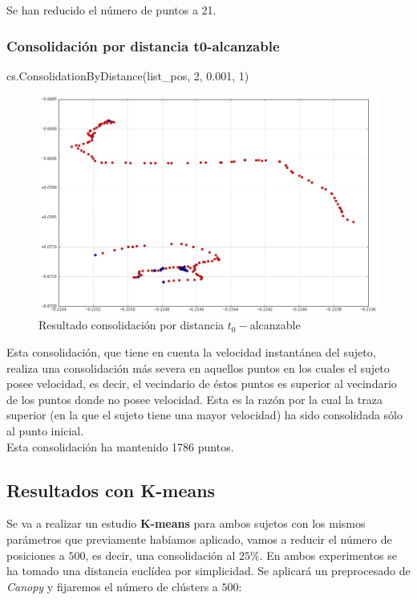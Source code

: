 \documentclass[a4paper, 12pt, spanish]{article}
\begin{document}
Se han reducido el n\'umero de puntos a 21.\\

\subsubsection{Consolidaci\'on por distancia t0-alcanzable}

\begin{python}
cs.ConsolidationByDistance(list_pos, 2, 0.001, 1)
\end{python}

\begin{figure}[H]
	\includegraphics[scale=.45]{../comparativa/t0Sujet1.png}
	\caption{Resultado consolidaci\'on por distancia $t_0-$alcanzable}
\end{figure}

Esta consolidaci\'on, que tiene en cuenta la velocidad instant\'anea del sujeto, realiza una consolidaci\'on m\'as severa en aquellos puntos en los cuales el sujeto posee velocidad, es decir, el vecindario de \'estos puntos es superior al vecindario de los puntos donde no posee velocidad. Esta es la raz\'on por la cual la traza superior (en la que el sujeto tiene una mayor velocidad) ha sido consolidada s\'olo al punto inicial. \\

Esta consolidaci\'on ha mantenido 1786 puntos.\\

\pagebreak
\subsection{Resultados con K-means}

Se va a realizar un estudio \textbf{K-means} para ambos sujetos con los mismos par\'ametros que previamente hab\'iamos aplicado, vamos a reducir el n\'umero de posiciones a $500$, es decir, una consolidaci\'on al $25\%$. En ambos experimentos se ha tomado una distancia eucl\'idea por simplicidad. Se aplicar\'a un preprocesado de \textit{Canopy} y fijaremos el n\'umero de cl\'usters a $500$: \\
\end{document}
